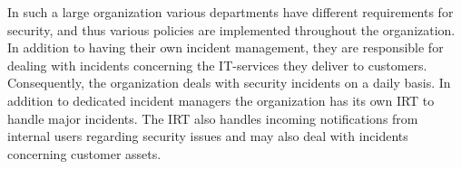 In such a large organization various departments have different requirements for security, and thus various policies are implemented throughout the organization. In addition to having their own incident management, they are responsible for dealing with incidents concerning the IT-services they deliver to customers. Consequently, the organization deals with security incidents on a daily basis. In addition to dedicated incident managers the organization has its own \ac{IRT} to handle major incidents. The \ac{IRT} also handles incoming notifications from internal users regarding security issues and may also deal with incidents concerning customer assets. 